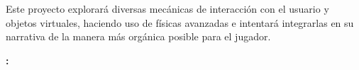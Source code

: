 \bigskip

Este proyecto explorará diversas mecánicas de interacción con el usuario y objetos virtuales, haciendo uso de físicas avanzadas e intentará integrarlas en su narrativa de la manera más orgánica posible para el jugador. 


\thispagestyle{empty}

\cleardoublepage

\begin{center}
	{\large\bfseries \myTitle: \myEnglishSubtitle}\\
\end{center}

\begin{center}
	\myName \\
\end{center}

\vspace{0.7cm}
\\

\vspace{0.7cm}
\\













\chapter*{}
\thispagestyle{empty}

